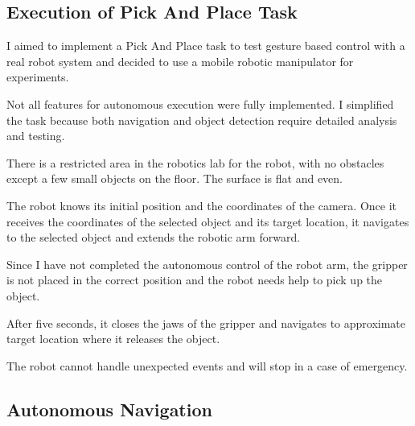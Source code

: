 \subsection{Execution of Pick And Place Task}
I aimed to implement a Pick And Place task to test gesture based control with a real robot system and decided to use a mobile robotic manipulator for experiments.\par
Not all features for autonomous execution were fully implemented. I simplified the task because both navigation and object detection require detailed analysis and testing.\par
There is a restricted area in the robotics lab for the robot, with no obstacles except a few small objects on the floor. The surface is flat and even.\par
The robot knows its initial position and the coordinates of the camera. Once it receives the coordinates of the selected object and its target location, it navigates to the selected object and extends the robotic arm forward.\par
Since I have not completed the autonomous control of the robot arm, the gripper is not placed in the correct position and the robot needs help to pick up the object.\par
After five seconds, it closes the jaws of the gripper and navigates to approximate target location where it releases the object.\par
The robot cannot handle unexpected events and will stop in a case of emergency.\par

\subsection{Autonomous Navigation}

